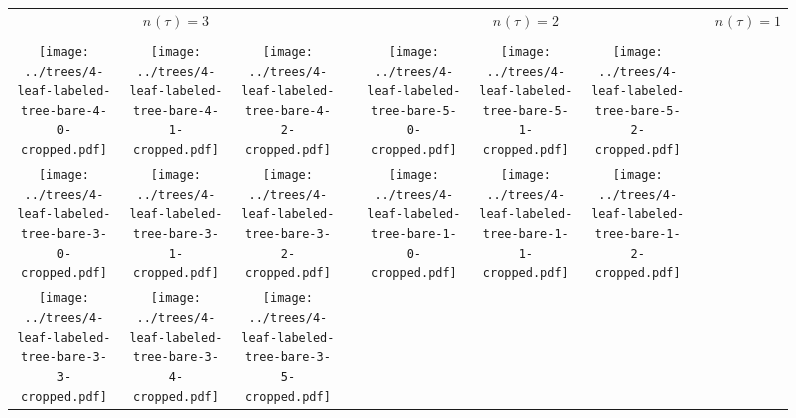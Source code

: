 \documentclass[border=10pt,varwidth=30cm]{standalone}
\newcommand{\divTimeSymbol}{\tau}
\newcommand{\divTime}[1]{\ensuremath{\divTimeSymbol_{#1}}\xspace}
\newcommand{\nOf}[2][]{\ensuremath{n_{#1}(#2)}\xspace}
\newcommand{\nDivs}{\ensuremath{\nOf[]{\divTime{}}}\xspace}
\newcommand{\pltwidth}{0.1}
\newcommand{\catspace}{0.01}
\begin{document}
\begin{figure}
    \setlength\arrayrulewidth{2pt}
    \centering
    \begin{tabular}{@{}|ccc|cccccc@{}}
        \multicolumn{3}{c}{\Huge $\nDivs = 3$} & & \multicolumn{3}{c}{\Huge $\nDivs = 2$} & & \multicolumn{1}{c}{\Huge $\nDivs = 1$} \\[2.0ex]
        \cline{1-3}\cline{5-7}\cline{9-9}
        & & & & & & & & \\[1ex]
        \texttt{[image: ../trees/4-leaf-labeled-tree-bare-4-0-cropped.pdf]}
        &
        \texttt{[image: ../trees/4-leaf-labeled-tree-bare-4-1-cropped.pdf]}
        &
        \texttt{[image: ../trees/4-leaf-labeled-tree-bare-4-2-cropped.pdf]}
        &
        \hspace{\catspace\textwidth}
        &
        \texttt{[image: ../trees/4-leaf-labeled-tree-bare-5-0-cropped.pdf]}
        &
        \texttt{[image: ../trees/4-leaf-labeled-tree-bare-5-1-cropped.pdf]}
        &
        \texttt{[image: ../trees/4-leaf-labeled-tree-bare-5-2-cropped.pdf]}
        &
        \hspace{\catspace\textwidth}
        &
        \\
        \texttt{[image: ../trees/4-leaf-labeled-tree-bare-3-0-cropped.pdf]}
        &
        \texttt{[image: ../trees/4-leaf-labeled-tree-bare-3-1-cropped.pdf]}
        &
        \texttt{[image: ../trees/4-leaf-labeled-tree-bare-3-2-cropped.pdf]}
        &
        &
        \texttt{[image: ../trees/4-leaf-labeled-tree-bare-1-0-cropped.pdf]}
        &
        \texttt{[image: ../trees/4-leaf-labeled-tree-bare-1-1-cropped.pdf]}
        &
        \texttt{[image: ../trees/4-leaf-labeled-tree-bare-1-2-cropped.pdf]}
        &
        &
        \\
        \texttt{[image: ../trees/4-leaf-labeled-tree-bare-3-3-cropped.pdf]}
        &
        \texttt{[image: ../trees/4-leaf-labeled-tree-bare-3-4-cropped.pdf]}
        &
        \texttt{[image: ../trees/4-leaf-labeled-tree-bare-3-5-cropped.pdf]}
        &
        &

\end{tabular}
\end{figure}
\end{document}
